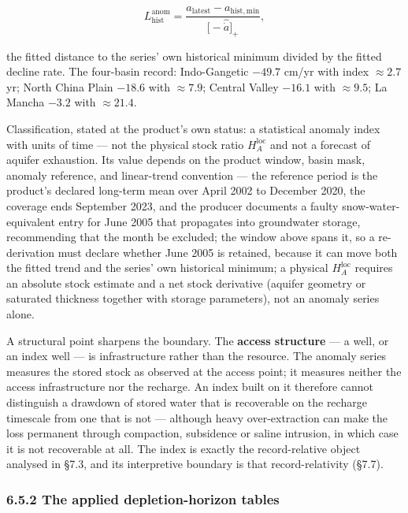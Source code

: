 \documentclass[11pt]{article}
\begin{document}
$$L_{\mathrm{hist}}^{\mathrm{anom}} = \frac{a_{\mathrm{latest}} - a_{\mathrm{hist,min}}}{\bigl[ -\widehat{\dot a} \bigr]_+},$$

 the fitted distance to the series' own historical minimum divided by the fitted decline rate. The four-basin record: Indo-Gangetic \(-49.7\) cm/\allowbreak{}yr with index \(\approx 2.7\) yr; North China Plain \(-18.6\) with \(\approx 7.9\); Central Valley \(-16.1\) with \(\approx 9.5\); La Mancha \(-3.2\) with \(\approx 21.4\).

Classification, stated at the product's own status: a statistical anomaly index with units of time --- not the physical stock ratio \(H_A^{\mathrm{loc}}\) and not a forecast of aquifer exhaustion. Its value depends on the product window, basin mask, anomaly reference, and linear-trend convention --- the reference period is the product's declared long-term mean over April 2002 to December 2020, the coverage ends September 2023, and the producer documents a faulty snow-water-equivalent entry for June 2005 that propagates into groundwater storage, recommending that the month be excluded; the window above spans it, so a re-derivation must declare whether June 2005 is retained, because it can move both the fitted trend and the series' own historical minimum; a physical \(H_A^{\mathrm{loc}}\) requires an absolute stock estimate and a net stock derivative (aquifer geometry or saturated thickness together with storage parameters), not an anomaly series alone.

A structural point sharpens the boundary. The \textbf{access structure} --- a well, or an index well --- is infrastructure rather than the resource. The anomaly series measures the stored stock as observed at the access point; it measures neither the access infrastructure nor the recharge. An index built on it therefore cannot distinguish a drawdown of stored water that is recoverable on the recharge timescale from one that is not --- although heavy over-extraction can make the loss permanent through compaction, subsidence or saline intrusion, in which case it is not recoverable at all. The index is exactly the record-relative object analysed in \S7.3, and its interpretive boundary is that record-relativity (\S7.7).

\subsubsection*{6.5.2 The applied depletion-horizon tables}\label{652-the-applied-depletion-horizon-tables}
\end{document}
